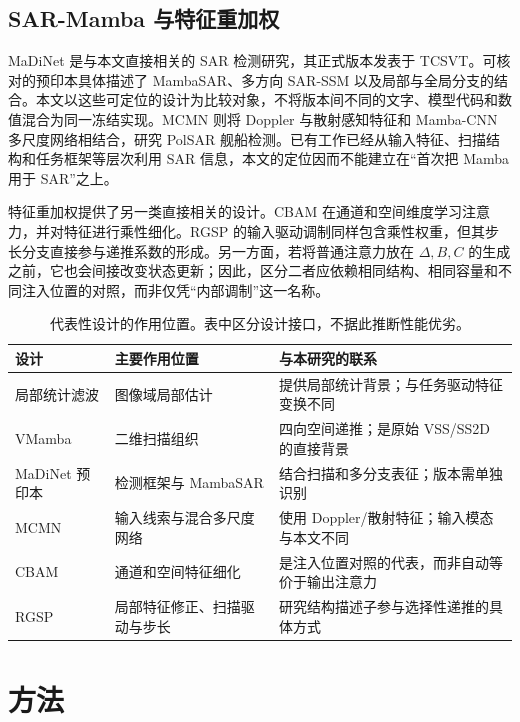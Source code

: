 \documentclass[UTF8,11pt,a4paper,fontset=fandol]{ctexart}
\begin{document}
\subsection{SAR-Mamba 与特征重加权}
MaDiNet 是与本文直接相关的 SAR 检测研究，其正式版本发表于 TCSVT\cite{madinet2025}。可核对的预印本具体描述了 MambaSAR、多方向 SAR-SSM 以及局部与全局分支的结合\cite{madinet2024v1}。本文以这些可定位的设计为比较对象，不将版本间不同的文字、模型代码和数值混合为同一冻结实现。MCMN 则将 Doppler 与散射感知特征和 Mamba-CNN 多尺度网络相结合，研究 PolSAR 舰船检测\cite{mcmn2026}。已有工作已经从输入特征、扫描结构和任务框架等层次利用 SAR 信息，本文的定位因而不能建立在“首次把 Mamba 用于 SAR”之上。

特征重加权提供了另一类直接相关的设计。CBAM 在通道和空间维度学习注意力，并对特征进行乘性细化\cite{cbam2018}。RGSP 的输入驱动调制同样包含乘性权重，但其步长分支直接参与递推系数的形成。另一方面，若将普通注意力放在 $\Delta,B,C$ 的生成之前，它也会间接改变状态更新；因此，区分二者应依赖相同结构、相同容量和不同注入位置的对照，而非仅凭“内部调制”这一名称。

\begin{table}[!htbp]\centering\small
\caption{代表性设计的作用位置。表中区分设计接口，不据此推断性能优劣。}
\label{tab:related}
\begin{tabularx}{\linewidth}{P{2.5cm}P{3.25cm}Y}
\toprule
设计 & 主要作用位置 & 与本研究的联系\\
\midrule
局部统计滤波\cite{lee1980} & 图像域局部估计 & 提供局部统计背景；与任务驱动特征变换不同\\
VMamba\cite{vmamba2024} & 二维扫描组织 & 四向空间递推；是原始 VSS/SS2D 的直接背景\\
MaDiNet 预印本\cite{madinet2024v1} & 检测框架与 MambaSAR & 结合扫描和多分支表征；版本需单独识别\\
MCMN\cite{mcmn2026} & 输入线索与混合多尺度网络 & 使用 Doppler/散射特征；输入模态与本文不同\\
CBAM\cite{cbam2018} & 通道和空间特征细化 & 是注入位置对照的代表，而非自动等价于输出注意力\\
RGSP & 局部特征修正、扫描驱动与步长 & 研究结构描述子参与选择性递推的具体方式\\
\bottomrule
\end{tabularx}
\end{table}
\FloatBarrier

\section{方法}\label{sec:method}
\end{document}
